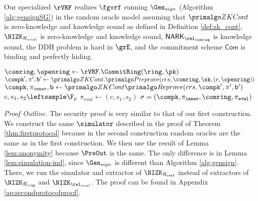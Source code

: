 \begin{theorem}\label{thm:rvrfspecial}
	Our specialized $ \rVRF $   realizes $ \fgvrf $ running $ \Gen_{sign} $ (Algorithm \ref{alg:gensignSG}) \cite{canetti1,canetti2} in the random oracle model assuming that $\ZKCont $ is zero-knowledge and knowledge sound as defined in Definition \ref{def:zk_cont}, $ \NIZK_{\mathcal{R}_{eval}} $ is zero-knowledge and knowledge sound, $ \NARK_{\relcomring} $ is knowledge sound, the DDH problem is hard in $ \grE  $, %
	and the commitment scheme $ \mathsf{Com} $ is binding and perfectly hiding. 
\end{theorem}
\begin{algorithm}
	\eprint{}{\scriptsize}
	\caption{$\Gen_{sign}(\ring, \sk= (x,r),\pk,\aux,\msg)$}
	\label{alg:gensignSG}	 	
	\begin{algorithmic}[1]
		\State $ \comring, \openring \leftarrow \rVRF.\CommitRing(\ring, \pk) $
		\State $ \compk', \pi', \openpk' \leftarrow \ZKCont.\Preprove(crs, \comring,\sk,(r,\openring)) $
		\State $ \compk, \pi_{\mathtt{inner}}, \openpk \leftarrow \ZKCont\Reprove(crs, \compk',\pi',\openpk') $ 
		\State $ c,s_1, s_2 \leftsample \F_p $
		\State $ \pi_{eval}  \leftarrow (c,s_1, s_2)$		
		\State\Return$ \sigma = (\compk, \pi_{\mathtt{inner}},\comring, \pieval) $
	\end{algorithmic}
	
\end{algorithm}

\noindent \textit{Proof Outline.}  The security proof is very similar to that of our first construction.
We construct the same $ \simulator $ described in the proof of Theorem \ref{thm:firstprotocol} because in the second construction random oracles are the same as in the first construction. We then use the result of Lemma \ref{lem:anonymity} because $ \PreOut $ is the same. The only difference is in Lemma \ref{lem:simulation-ind}, since $ \Gen_{sign} $ is different than Algorithm \ref{alg:gensign}. There, we run the simulator and extractor of $ \NIZK_{\relrvrf} $  instead of extractors of  $ \NIZK_{\Rring} $ and $ \NIZK_{\rel_{eval}} $. The proof can be found in Appendix \ref{ap:secondprotocolproof}.




